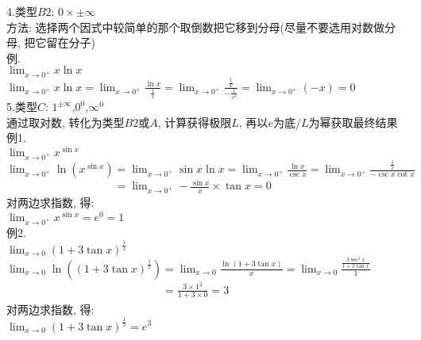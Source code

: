 4.类型$B2$: $0\times\pm\infty$\\
方法: 选择两个因式中较简单的那个取倒数把它移到分母(尽量不要选用对数做分母, 把它留在分子)\\
例.\\
\phantom{例}$\displaystyle\lim_{x\to 0^+}x\ln x$\\
$\displaystyle\lim_{x\to 0^+}x\ln x=\lim_{x\to 0^+}\frac{\ln x}{\frac{1}{x}}=\lim_{x\to 0^+}\frac{\frac{1}{x}}{-\frac{1}{x^2}}=\lim_{x\to 0^+}(-x)=0$\\[2ex]

5.类型$C$: $1^{\pm\infty}$,$0^0$,$\infty^0$\\
通过取对数, 转化为类型$B2$或$A$, 计算获得极限$L$, 再以$e$为底/$L$为幂获取最终结果\\
例1.\\
\phantom{例}$\displaystyle\lim_{x\to 0^+}x^{\sin x}$\\
$\displaystyle\lim_{x\to 0^+}\ln(x^{\sin x})=\lim_{x\to 0^+}\sin x\ln x=\lim_{x\to 0^+}\frac{\ln x}{\csc x}=\lim_{x\to 0^+}\frac{\frac{1}{x}}{-\csc x\cot x}$\\
$\displaystyle\phantom{\lim_{x\to 0^+}\ln(x^{\sin x})}=\lim_{x\to 0^+}-\frac{\sin x}{x}\times\tan x=0$\\
对两边求指数, 得:\\
$\displaystyle\lim_{x\to 0^+}x^{\sin x}=e^0=1$\\[2ex]

例2.\\
\phantom{例}$\displaystyle\lim_{x\to 0}(1+3\tan x)^{\frac{1}{x}}$\\
$\displaystyle\lim_{x\to 0}\ln((1+3\tan x)^{\frac{1}{x}})=\lim_{x\to 0}\frac{\ln(1+3\tan x)}{x}=\lim_{x\to 0}\frac{\frac{3\sec^2x}{1+3\tan x}}{1}$\\
$\displaystyle\phantom{\lim_{x\to 0}\ln((1+3\tan x)^{\frac{1}{x}})}=\frac{3\times1^2}{1+3\times0}=3$\\
对两边求指数, 得:\\
$\displaystyle\lim_{x\to 0}(1+3\tan x)^{\frac{1}{x}}=e^3$

